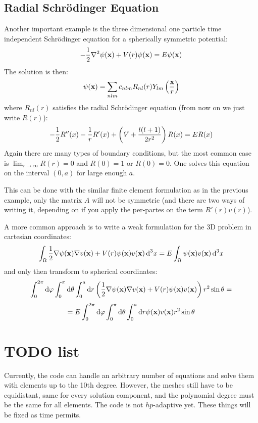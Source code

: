 \documentclass[12pt]{article}
\def\d{\mbox{d}}
\begin{document}
\subsection{Radial Schr\"odinger Equation}
Another important example is the three dimensional one particle time
independent Schr\"odinger equation for a spherically symmetric potential:
$$
-{1\over2}\nabla^2\psi({\bf x})+V(r)\psi({\bf x})=E\psi({\bf x})
$$
The solution is then:
$$\psi({\bf x})=\sum_{nlm}c_{nlm}R_{nl}(r)Y_{lm}\left({\bf x}\over r\right)$$
where $R_{nl}(r)$ satisfies the radial Schr\"odinger equation (from now on we
just write $R(r)$):
$$-{1\over2}R''(x)-{1\over r}R'(x)+\left(V+{l(l+1)\over2r^2}\right)R(x)=ER(x)$$
Again there are many types of boundary conditions, but the most common case is
$\lim_{r\to\infty}R(r)=0$ and $R(0)=1$ or $R(0)=0$. One solves this equation on
the interval $(0, a)$ for large enough $a$.

This can be done with the similar
finite element formulation as in the previous example, only the
matrix $A$ will not be symmetric (and there are two ways of writing it,
depending on if you apply the per-partes on the term $R'(r)v(r)$).

A more common approach is to write a weak formulation for
the 3D problem in cartesian coordinates:
$$
\int_\Omega{1\over2}\nabla\psi({\bf x})\nabla v({\bf x})+V(r)\psi({\bf x})v({\bf
x})\,\d^3 x
=E\int_\Omega\psi({\bf x})v({\bf x})\,\d^3 x
$$
and only then transform to spherical coordinates:
$$
\int_0^{2\pi}\d\varphi\int_0^\pi\d\theta\int_0^a\d r
\left({1\over2}\nabla\psi({\bf x})\nabla v({\bf x})+V(r)\psi({\bf
x})v({\bf x})\right)r^2\sin\theta=
$$
$$
=
E\int_0^{2\pi}\d\varphi\int_0^\pi\d\theta\int_0^a\d r
\psi({\bf x})v({\bf x})r^2\sin\theta
$$

\section{TODO list}

Currently, the code can handle an arbitrary number of equations and solve them
with elements up to the 10th degree. However, the meshes still have to be
equidistant, same for every solution component, and the polynomial degree must
be the same for all elements. The code is not $hp$-adaptive yet. These things
will be fixed as time permits.
\end{document}

